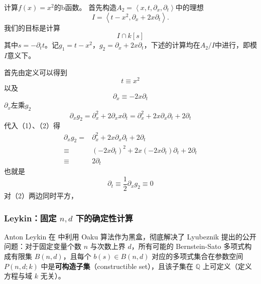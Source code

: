 \begin{example}
    计算$f(x) = x^2$的b函数。
    首先构造$A_2=\left\langle x,t,\partial_x,\partial_t \right\rangle$中的理想
    \begin{equation*}
        I=\left\langle t-x^2, \partial_x + 2x\partial_t \right\rangle.
    \end{equation*}
    我们的目标是计算
    \begin{equation*}
        I\cap k[s]
    \end{equation*}
    其中$s=-\partial_t t$。记$g_1=t-x^2$，$g_2=\partial_x + 2x\partial_t$，下述的计算均在$A_2/I$中进行，即模$I$意义下。

    首先由定义可以得到
    \begin{equation*}
        t\equiv x^2 \tag{1}
    \end{equation*}
    以及
    \begin{equation*}
        \partial_x\equiv -2x\partial_t \tag{2}
    \end{equation*}
    $\partial_x$左乘$g_2$
    \begin{equation*}
        \partial_x g_2 =  \partial_x^2 + 2\partial_x x\partial_t=\partial_x^2 + 2x\partial_x\partial_t + 2\partial_t
    \end{equation*}
    代入（1）、（2）得
    \begin{equation*}
        \begin{aligned}
            \partial_x g_2 = & \partial_x^2 + 2x\partial_x\partial_t +2\partial_t          \\
            \equiv           & (-2x\partial_t)^2 + 2x(-2x\partial_t)\partial_t+2\partial_t \\
            \equiv           & 2\partial_t
        \end{aligned}
    \end{equation*}
    也就是
    \begin{equation*}
        \partial_t\equiv \frac{1}{2}\partial_x g_2\equiv 0 \tag{3}
    \end{equation*}
    对（2）两边同时平方，

\end{example}




\subsubsection{Leykin：固定 \(n,d\) 下的确定性计算}

Anton Leykin 在 \cite{leykin2000definitive} 中利用 Oaku 算法作为黑盒，彻底解决了 Lyubeznik 提出的公开问题：对于固定变量个数 \(n\) 与次数上界 \(d\)，所有可能的 Bernstein-Sato 多项式构成有限集 \(B(n,d)\)，且每个 \(b(s)\in B(n,d)\) 对应的多项式集合在参数空间 \(P(n,d;k)\) 中是\textbf{可构造子集}（constructible set），且该子集在 \(\mathbb{Q}\) 上可定义（定义方程与域 \(k\) 无关）。

